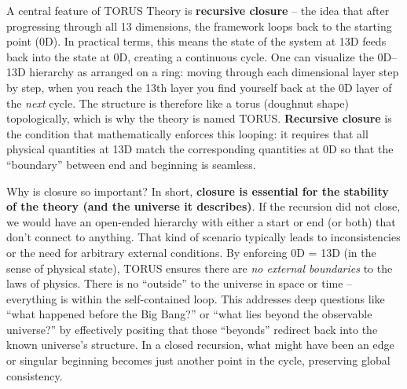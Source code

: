 \documentclass[
]{article}
\begin{document}
A central feature of TORUS Theory is \textbf{recursive closure} -- the
idea that after progressing through all 13 dimensions, the framework
loops back to the starting point (0D). In practical terms, this means
the state of the system at 13D feeds back into the state at 0D, creating
a continuous cycle. One can visualize the 0D--13D hierarchy as arranged
on a ring: moving through each dimensional layer step by step, when you
reach the 13th layer you find yourself back at the 0D layer of the
\emph{next} cycle. The structure is therefore like a torus (doughnut
shape) topologically, which is why the theory is named TORUS.
\textbf{Recursive closure} is the condition that mathematically enforces
this looping: it requires that all physical quantities at 13D match the
corresponding quantities at 0D so that the ``boundary'' between end and
beginning is seamless\hspace{0pt}.

Why is closure so important? In short, \textbf{closure is essential for
the stability of the theory (and the universe it describes)}. If the
recursion did not close, we would have an open-ended hierarchy with
either a start or end (or both) that don't connect to anything. That
kind of scenario typically leads to inconsistencies or the need for
arbitrary external conditions. By enforcing 0D = 13D (in the sense of
physical state), TORUS ensures there are \emph{no external boundaries}
to the laws of physics. There is no ``outside'' to the universe in space
or time -- everything is within the self-contained loop. This addresses
deep questions like ``what happened before the Big Bang?'' or ``what
lies beyond the observable universe?'' by effectively positing that
those ``beyonds'' redirect back into the known universe's
structure\hspace{0pt}. In a closed recursion, what might have been an
edge or singular beginning becomes just another point in the cycle,
preserving global consistency.
\end{document}
